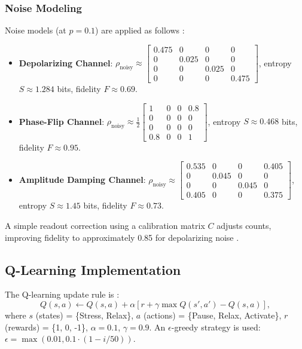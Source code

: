 \documentclass[12pt]{article}
\begin{document}
\subsubsection{Noise Modeling}
Noise models (at $p=0.1$) are applied as follows \citep{ibmq2024}:
\begin{itemize}
    \item \textbf{Depolarizing Channel}: $\rho_{\text{noisy}} \approx \begin{bmatrix} 0.475 & 0 & 0 & 0 \\ 0 & 0.025 & 0 & 0 \\ 0 & 0 & 0.025 & 0 \\ 0 & 0 & 0 & 0.475 \end{bmatrix}$, entropy $S \approx 1.284$ bits, fidelity $F \approx 0.69$.
    \item \textbf{Phase-Flip Channel}: $\rho_{\text{noisy}} \approx \frac{1}{2} \begin{bmatrix} 1 & 0 & 0 & 0.8 \\ 0 & 0 & 0 & 0 \\ 0 & 0 & 0 & 0 \\ 0.8 & 0 & 0 & 1 \end{bmatrix}$, entropy $S \approx 0.468$ bits, fidelity $F \approx 0.95$.
    \item \textbf{Amplitude Damping Channel}: $\rho_{\text{noisy}} \approx \begin{bmatrix} 0.535 & 0 & 0 & 0.405 \\ 0 & 0.045 & 0 & 0 \\ 0 & 0 & 0.045 & 0 \\ 0.405 & 0 & 0 & 0.375 \end{bmatrix}$, entropy $S \approx 1.45$ bits, fidelity $F \approx 0.73$.
\end{itemize}

A simple readout correction using a calibration matrix $C$ adjusts counts, improving fidelity to approximately 0.85 for depolarizing noise \citep{bravyi2021mitigating}.

\subsection{Q-Learning Implementation}
The Q-learning update rule is \citep{sutton1998reinforcement}:
\[
Q(s,a) \leftarrow Q(s,a) + \alpha \left[ r + \gamma \max Q(s', a') - Q(s,a) \right],
\]
where $s$ (states) = \{Stress, Relax\}, $a$ (actions) = \{Pause, Relax, Activate\}, $r$ (rewards) = \{1, 0, -1\}, $\alpha = 0.1$, $\gamma = 0.9$. An $\epsilon$-greedy strategy is used: $\epsilon = \max(0.01, 0.1 \cdot (1 - i/50))$.
\end{document}
